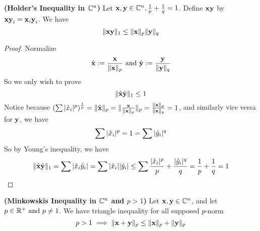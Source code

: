 \documentclass{report}
\begin{document}
\begin{theorem}
\label{4.1.3}
\textbf{(Holder's Inequality in $\mathbb{C}^n$)} Let $\textbf{x},\textbf{y}\in \mathbb{C}^n,\frac{1}{p}+\frac{1}{q}=1$. Define $\textbf{xy}$ by $\textbf{xy}_i=\textbf{x}_i\textbf{y}_i$. We have
\begin{equation}
\| \textbf{xy} \|_1\leq \| \textbf{x} \|_p\| \textbf{y} \|_q
\end{equation}
\end{theorem}
\begin{proof}
Normalize 
\begin{equation}
\hat{\textbf{x}}:= \frac{\textbf{x}}{\| \textbf{x} \|_p}\text{ and }\hat{\textbf{y}}:=\frac{\textbf{y}}{\| \textbf{y} \|_q}
\end{equation}
So we only wish to prove
\begin{equation}
\| \hat{\textbf{x}}\hat{\textbf{y}} \|_1\leq 1 
\end{equation}
Notice because $(\sum |\hat{x}_i|^p)^{\frac{1}{p}}=\| \hat{\textbf{x}} \|_p=\| \frac{\textbf{x}}{\| \textbf{x} \|_p} \|_p=\frac{\| \textbf{x} \|_p}{\| \textbf{x} \|_p}=1$, and similarly vice versa for $\textbf{y}$, we have \begin{equation}
\sum |\hat{x}_i|^p=1=\sum |\hat{y}_i|^q \end{equation} So by Young's inequality, we have \begin{equation} \| \hat{\textbf{x}}\hat{\textbf{y}} \|_1= \sum |\hat{x }_i\hat{y}_i|=\sum |\hat{x}_i||\hat{y}_i|\leq \sum \frac{|\hat{x}_i|^p}{p}+\frac{|\hat{y}_i|^q}{q}=\frac{1}{p}+\frac{1}{q}=1
\end{equation}
\end{proof}
\begin{corollary}
\label{4.1.4}
\textbf{(Minkowskis Inequality in $\mathbb{C}^n$ and $p>1$)} Let $\textbf{x},\textbf{y}\in\mathbb{C}^n$, and let $p\in \mathbb{R}^+\text{ and }p\neq 1$. We have triangle inequality for all supposed $p$-norm
\begin{equation}
p>1\implies  \| \textbf{x}+\textbf{y} \|_p\leq \| \textbf{x} \|_p+\| \textbf{y} \|_p
\end{equation}
\end{corollary}
\end{document}

